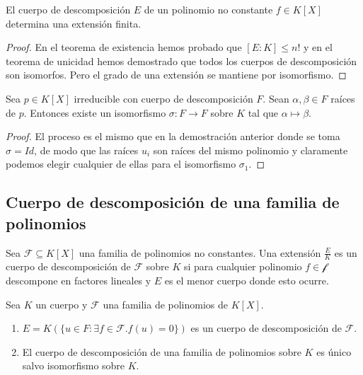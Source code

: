 \begin{corollary}
El cuerpo de descomposición $E$ de un polinomio no constante $f \in K[X]$ determina una extensión finita.
\end{corollary}
\begin{proof}
En el teorema de existencia hemos probado que $[E:K] \le n!$ y en el teorema de unicidad hemos demostrado que todos los cuerpos de descomposición son isomorfos. Pero el grado de una extensión se mantiene por isomorfismo. 
\end{proof}

\begin{corollary}
Sea $p \in K[X]$ irreducible con cuerpo de descomposición $F$. Sean $\alpha,\beta \in F$ raíces de $p$. Entonces existe un isomorfismo $\sigma:F \to F$ sobre $K$ tal que $\alpha \mapsto \beta$. 
\end{corollary}
\begin{proof}
El proceso es el mismo que en la demostración anterior donde se toma $\sigma = Id$, de modo que las raíces $u_i$ son raíces del mismo polinomio y claramente podemos elegir cualquier de ellas para el isomorfismo $\sigma_1$.
\end{proof}

\subsection{Cuerpo de descomposición de una familia de polinomios}

\begin{definition}
Sea $\mathcal{F} \subseteq K[X]$ una familia de polinomios no constantes. Una extensión $\frac{E}{K}$ es un cuerpo de descomposición de $\mathcal{F}$ sobre $K$ si para cualquier polinomio $f \in \mathcal{f}$ descompone en factores lineales y $E$ es el menor cuerpo donde esto ocurre.
\end{definition}

\begin{proposition}
Sea $K$ un cuerpo y $\mathcal{F}$ una familia de polinomios de $K[X]$.

\begin{enumerate}
\item $E = K(\{u \in F:\exists f \in \mathcal{F}. f(u) = 0\})$ es un cuerpo de descomposición de $\mathcal{F}$.
\item El cuerpo de descomposición de una familia de polinomios sobre $K$ es único salvo isomorfismo sobre $K$.  
\end{enumerate}
\end{proposition}



